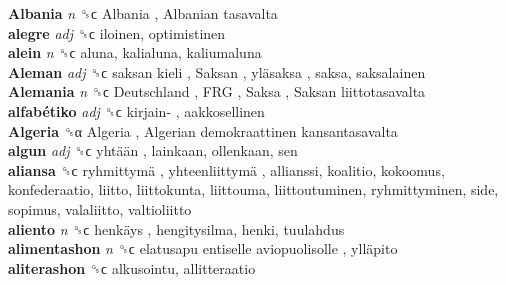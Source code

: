 \textbf{Albania} \emph{n}  ␝ϲ   Albania ,  Albanian tasavalta   \\
\textbf{alegre} \emph{adj}  ␝ϲ  iloinen, optimistinen  \\
\textbf{alein} \emph{n}  ␝ϲ  aluna, kalialuna, kaliumaluna  \\
\textbf{Aleman} \emph{adj}  ␝ϲ   saksan kieli ,  Saksan ,  yläsaksa , saksa, saksalainen  \\
\textbf{Alemania} \emph{n}  ␝ϲ   Deutschland ,  FRG ,  Saksa ,  Saksan liittotasavalta   \\
\textbf{alfabétiko} \emph{adj}  ␝ϲ   kirjain- , aakkosellinen  \\
\textbf{Algeria} ␝α   Algeria ,  Algerian demokraattinen kansantasavalta   \\
\textbf{algun} \emph{adj}  ␝ϲ   yhtään , lainkaan, ollenkaan, sen  \\
\textbf{aliansa} ␝ϲ   ryhmittymä ,  yhteenliittymä , allianssi, koalitio, kokoomus, konfederaatio, liitto, liittokunta, liittouma, liittoutuminen, ryhmittyminen, side, sopimus, valaliitto, valtioliitto  \\
\textbf{aliento} \emph{n}  ␝ϲ   henkäys , hengitysilma, henki, tuulahdus  \\
\textbf{alimentashon} \emph{n}  ␝ϲ   elatusapu entiselle aviopuolisolle ,  ylläpito   \\
\textbf{aliterashon} ␝ϲ  alkusointu, allitteraatio  \\
